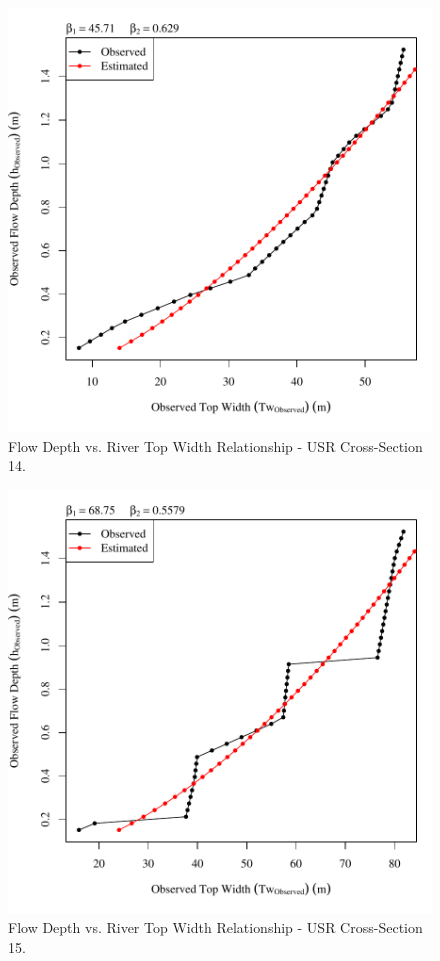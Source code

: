 \begin{center}
\begin{figure}[htbp]
	\includegraphics[width=6in]{"Figures/Results_USR/Survey Tw vs H-Section 14"}
	\caption{Flow Depth vs. River Top Width Relationship - USR Cross-Section 14.}
\end{figure}
\end{center}
\newpage

\begin{center}
\begin{figure}[htbp]
	\includegraphics[width=6in]{"Figures/Results_USR/Survey Tw vs H-Section 15"}
	\caption{Flow Depth vs. River Top Width Relationship - USR Cross-Section 15.}
\end{figure}
\end{center}
\newpage

